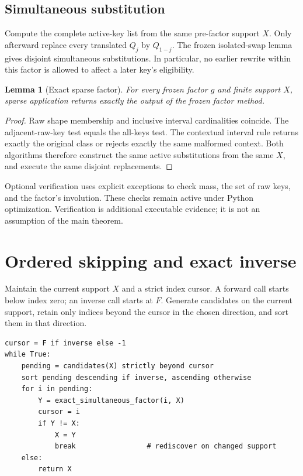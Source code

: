 \documentclass[11pt,a4paper]{article}
\numberwithin{equation}{section}
\newtheorem{lemma}[theorem]{Lemma}
\begin{document}
\subsection{Simultaneous substitution}
Compute the complete active-key list from the same pre-factor support $X$. Only afterward replace every translated $Q_j$ by $Q_{1-j}$. The frozen isolated-swap lemma gives disjoint simultaneous substitutions. In particular, no earlier rewrite within this factor is allowed to affect a later key's eligibility.

\begin{lemma}[Exact sparse factor]\label{fpa:lz:lem:factor}
For every frozen factor $g$ and finite support $X$, sparse application returns exactly the output of the frozen factor method.
\end{lemma}
\begin{proof}
Raw shape membership and inclusive interval cardinalities coincide. The adjacent-raw-key test equals the all-keys test. The contextual interval rule returns exactly the original class or rejects exactly the same malformed context. Both algorithms therefore construct the same active substitutions from the same $X$, and execute the same disjoint replacements.
\end{proof}
Optional verification uses explicit exceptions to check mass, the set of raw keys, and the factor's involution. These checks remain active under Python optimization. Verification is additional executable evidence; it is not an assumption of the main theorem.

\section{Ordered skipping and exact inverse}\label{fpa:lz:sec:order}
Maintain the current support $X$ and a strict index cursor. A forward call starts below index zero; an inverse call starts at $F$. Generate candidates on the current support, retain only indices beyond the cursor in the chosen direction, and sort them in that direction.
\begin{lstlisting}
cursor = F if inverse else -1
while True:
    pending = candidates(X) strictly beyond cursor
    sort pending descending if inverse, ascending otherwise
    for i in pending:
        Y = exact_simultaneous_factor(i, X)
        cursor = i
        if Y != X:
            X = Y
            break                 # rediscover on changed support
    else:
        return X
\end{lstlisting}
\end{document}
